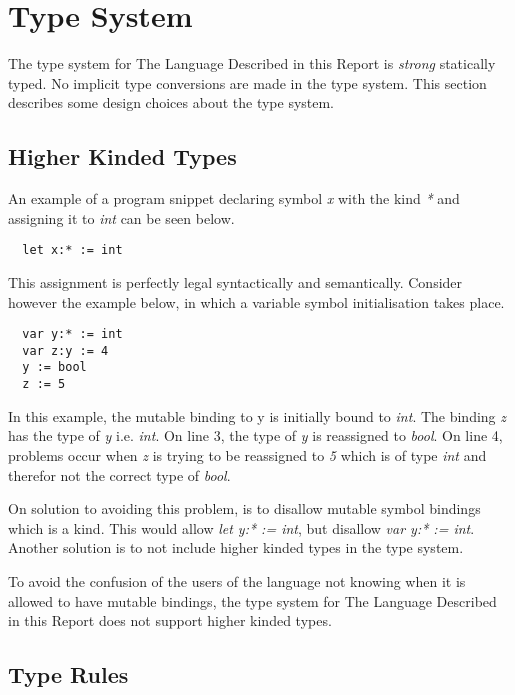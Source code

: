 \section{Type System}

The type system for The Language Described in this Report is \emph{strong} statically typed. No implicit type conversions are made in the type system. This section describes some design choices about the type system.

\subsection{Higher Kinded Types}
An example of a program snippet declaring symbol \emph{x} with the kind \emph{*} and assigning it to \emph{int} can be seen below.

\begin{verbatim}
  let x:* := int
\end{verbatim}

This assignment is perfectly legal syntactically and semantically. Consider however the example below, in which a variable symbol initialisation takes place.

\begin{verbatim}
  var y:* := int
  var z:y := 4
  y := bool
  z := 5
\end{verbatim}

In this example, the mutable binding to y is initially bound to \emph{int}. The binding \emph{z} has the type of \emph{y} i.e. \emph{int}. On line 3, the type of \emph{y} is reassigned to \emph{bool}. On line 4, problems occur when \emph{z} is trying to be reassigned to \emph{5} which is of type \emph{int} and therefor not the correct type of \emph{bool}.

On solution to avoiding this problem, is to disallow mutable symbol bindings which is a kind. This would allow \emph{let y:* := int}, but disallow \emph{var y:* := int}. Another solution is to not include higher kinded types in the type system.

To avoid the confusion of the users of the language not knowing when it is allowed to have mutable bindings, the type system for The Language Described in this Report does not support higher kinded types.

\subsection{Type Rules}

\newcommand{\Tpot}{^\wedge{}}
\newcommand{\Tint}{\text{int}}
\newcommand{\Treal}{\text{real}}
\newcommand{\Tbool}{\text{bool}}
\newcommand{\Tchar}{\text{char}}
\newcommand{\Tvoid}{\text{void}}
\newcommand{\Taop}{\text{AOP}}
\newcommand{\Tbaop}{\text{BAOP}}
\newcommand{\Tbop}{\text{BOP}}
\newcommand{\Tconct}{\text{CONCT}}
\newcommand{\Tpt}{\text{PT}}
\newcommand{\Tenv}{E \vdash}

